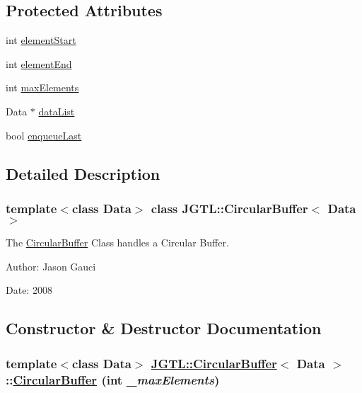 \subsection*{Protected Attributes}
\begin{CompactItemize}
\item 
int \hyperlink{class_j_g_t_l_1_1_circular_buffer_1197f15f4384dc23698b8984866acaed}{element\-Start}
\item 
int \hyperlink{class_j_g_t_l_1_1_circular_buffer_a6d3e6bd25f2a41248e86791723c472b}{element\-End}
\item 
int \hyperlink{class_j_g_t_l_1_1_circular_buffer_8ea7004de2215b2ef442f8b408d4d0f1}{max\-Elements}
\item 
Data $\ast$ \hyperlink{class_j_g_t_l_1_1_circular_buffer_83b02c98de53b41f01409b6404670283}{data\-List}
\item 
bool \hyperlink{class_j_g_t_l_1_1_circular_buffer_4f4fc63fe5f774cc8e5ab94e3e7177d4}{enqueue\-Last}
\end{CompactItemize}


\subsection{Detailed Description}
\subsubsection*{template$<$class Data$>$ class JGTL::Circular\-Buffer$<$ Data $>$}

The \hyperlink{class_j_g_t_l_1_1_circular_buffer}{Circular\-Buffer} Class handles a Circular Buffer. 

\begin{Desc}
\item[Author:]Jason Gauci \end{Desc}
\begin{Desc}
\item[Date:]2008 \end{Desc}




\subsection{Constructor \& Destructor Documentation}
\hypertarget{class_j_g_t_l_1_1_circular_buffer_31ecf77c576edebf19374d8f7add1966}{
\subsubsection[CircularBuffer]{\setlength{\rightskip}{0pt plus 5cm}template$<$class Data$>$ \hyperlink{class_j_g_t_l_1_1_circular_buffer}{JGTL::Circular\-Buffer}$<$ Data $>$::\hyperlink{class_j_g_t_l_1_1_circular_buffer}{Circular\-Buffer} (int {\em \_\-max\-Elements})}}
\label{class_j_g_t_l_1_1_circular_buffer_31ecf77c576edebf19374d8f7add1966}


